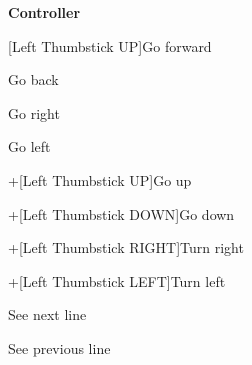 \documentclass[12pt,dvipdfmx]{article}
\begin{document}
\begin{center}

{\bf \LARGE Controller}

\end{center}

{\Large
[Left Thumbstick UP]\quad Go forward \par 
[Left Thumbstick DOWN]\quad Go back \par 
[Left Thumbstick RIGHT]\quad Go right \par 
[Left Thumbstick LEFT]\quad Go left \par 
[Left Index Trigger]+[Left Thumbstick UP]\quad Go up \par 
[Left Index Trigger]+[Left Thumbstick DOWN]\quad Go down \par 
[Left Index Trigger]+[Left Thumbstick RIGHT]\quad Turn right \par 
[Left Index Trigger]+[Left Thumbstick LEFT]\quad Turn left \par 
\bigskip\par
[Button A]\quad See next line \par
[Button B]\quad See previous line \par

}
\end{document}
